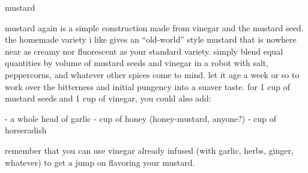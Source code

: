 mustard

mustard again is a simple construction made from vinegar and the mustard seed. the homemade variety i like gives an ``old-world'' style mustard that is nowhere near as creamy nor fluorescent as your standard variety. simply blend equal quantities by volume of mustard seeds and vinegar in a robot with salt, peppercorns, and whatever other spices come to mind. let it age a week or so to work over the bitterness and initial pungency into a suaver taste.
	for 1 cup of mustard seeds and 1 cup of vinegar, you could also add:

- a whole head of garlic
- \threequarters cup of honey (honey-mustard, anyone?)
- \onequarter cup of horseradish

remember that you can use vinegar already infused (with garlic, herbs, ginger, whatever) to get a jump on flavoring your mustard.
